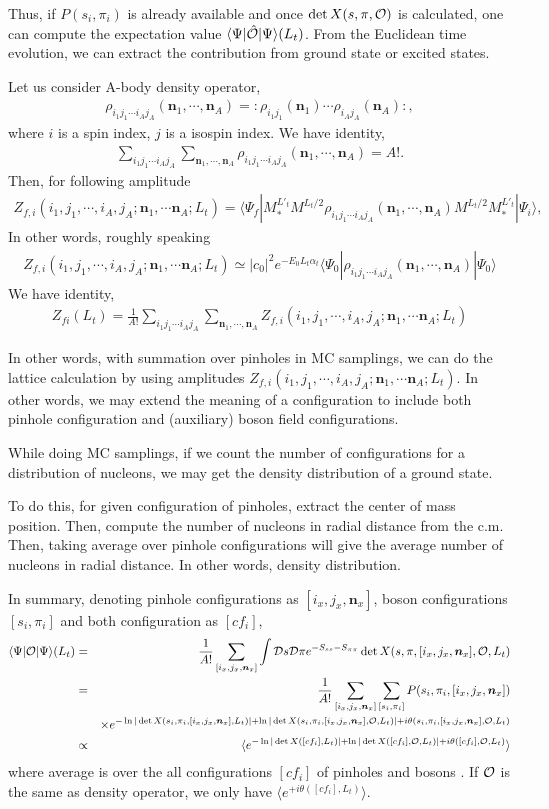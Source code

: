 \documentclass[10pt]{book}
\def\bm{\boldsymbol}
\newcommand{\bea}{\begin{eqnarray}}
\newcommand{\eea}{\end{eqnarray}}
\newcommand{\no}{\nonumber \\}
\def\vn{{\bm n}}
\def\la{\langle}
\def\ra{\rangle}
\begin{document}
 
Thus, if $P(s_i,\pi_i)$ is already available and once  $\det X(s,\pi,{\cal O})$ is 
calculated, one can compute the expectation value $\la \Psi|\hat{\cal O}|\Psi\ra(L_t)$. 
From the Euclidean time evolution, we can extract the contribution from ground state or excited states. 

Let us consider A-body density operator,
\bea 
\rho_{i_1j_1\cdots i_A j_A}(\vn_1,\cdots,\vn_A)=:\rho_{i_1 j_1}(\vn_1)\cdots \rho_{i_A j_A}(\vn_A): , 
\eea 
where $i$ is a spin index, $j$ is a isospin index. 
We have identity,
\bea 
\sum_{i_1 j_1\cdots i_A j_A}\sum_{\vn_1,\cdots,\vn_A} 
  \rho_{i_1j_1\cdots i_A j_A}(\vn_1,\cdots,\vn_A) =A !. 
\eea 
Then, for following amplitude 
\bea 
Z_{f,i}(i_1,j_1,\cdots,i_A,j_A;\vn_1,\cdots \vn_A;L_t)
=\la \Psi_f| M^{L'_t}_{*} M^{L_t/2} \rho_{i_1j_1\cdots i_A j_A}(\vn_1,\cdots,\vn_A)
             M^{L_t/2}M^{L'_t}_{*}|\Psi_i\ra ,
\eea 
In other words, roughly speaking 
\bea 
Z_{f,i}(i_1,j_1,\cdots,i_A,j_A;\vn_1,\cdots \vn_A;L_t)
\simeq |c_0|^2 e^{-E_0 L_t\alpha_t}\la \Psi_0|\rho_{i_1j_1\cdots i_A j_A}(\vn_1,\cdots,\vn_A)|\Psi_0\ra 
\eea 
We have identity,
\bea 
Z_{fi}(L_t)=\frac{1}{A!} \sum_{i_1 j_1\cdots i_A j_A}\sum_{\vn_1,\cdots,\vn_A} 
         Z_{f,i}(i_1,j_1,\cdots,i_A,j_A;\vn_1,\cdots \vn_A;L_t)
\eea 

In other words, with summation over pinholes in MC samplings, 
we can do the lattice calculation by using  amplitudes 
$Z_{f,i}(i_1,j_1,\cdots,i_A,j_A;\vn_1,\cdots \vn_A;L_t)$.
In other words, we may extend the meaning of a configuration 
to include both pinhole configuration and (auxiliary) boson field configurations. 
 
While doing MC samplings, if we count the number of configurations for 
a distribution of nucleons, we may get the density distribution of a ground state.   

To do this, for given configuration of pinholes, extract the center of mass position. 
Then, compute the number of nucleons in radial distance from the c.m. Then, taking 
average over pinhole configurations will give the average number of nucleons in radial distance.
In other words, density distribution. 

In summary,  denoting pinhole configurations as $[i_x,j_x,\vn_x]$, boson configurations $[s_i,\pi_i]$
and both configuration as $[cf_i]$,
\bea 
\la \Psi|{\cal O}|\Psi\ra(L_t) 
&=& \frac{1}{A!} \sum_{[i_x,j_x,\vn_x]} 
\int {\cal D}s {\cal D}\pi e^{-S_{ss}-S_{\pi\pi}} \det X(s,\pi,[i_x,j_x,\vn_x],{\cal O}, L_t) \no 
&=& \frac{1}{A!} \sum_{[i_x,j_x,\vn_x]}\sum_{[s_i,\pi_i]}  
     P(s_i,\pi_i,[i_x,j_x,\vn_x])  \no & &\times  
    e^{-\ln|\det X(s_i,\pi_i,[i_x,j_x,\vn_x],L_t)|+\ln|\det X(s_i,\pi_i,[i_x,j_x,\vn_x],{\cal O}, L_t)|+i\theta(s_i,\pi_i,[i_x,j_x,\vn_x],{\cal O}, L_t)}\no 
&\propto& \la e^{-\ln|\det X([cf_i],L_t)|+\ln|\det X([cf_i],{\cal O}, L_t)|+i\theta([cf_i],{\cal O}, L_t) }\ra      
\eea
where average is over the all configurations $[cf_i]$ of pinholes and bosons . 
If ${\cal O}$ is the same as density operator, we only have  $\la e^{+i\theta([cf_i], L_t) }\ra$. 
\end{document}

